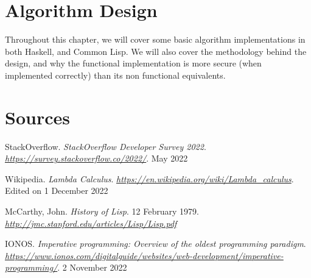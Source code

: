 \documentclass{report}
\newcommand{\csite}[5]{
  #2, #1. \textit{#3}. #4. \textit{\url{#5}} \newline
}
\newcommand{\link}[4]{
  #1. \textit{#2}. \textit{\url{#4}}. #3 \newline
}
\begin{document}
\chapter{Algorithm Design}
Throughout this chapter, we will cover some basic algorithm implementations in both Haskell, and Common Lisp. We will also cover the methodology behind the design, and why the functional implementation is more secure (when implemented correctly) than its non functional equivalents.


\newpage
\chapter{Sources}
\link{StackOverflow}{StackOverflow Developer Survey 2022}{May 2022}{https://survey.stackoverflow.co/2022/}
\link{Wikipedia}{Lambda Calculus}{Edited on 1 December 2022}{https://en.wikipedia.org/wiki/Lambda_calculus}
\csite{John}{McCarthy}{History of Lisp}{12 February 1979}{http://jmc.stanford.edu/articles/Lisp/Lisp.pdf}
\link{IONOS}{Imperative programming: Overview of the oldest programming paradigm}{2 November 2022}{https://www.ionos.com/digitalguide/websites/web-development/imperative-programming/}
\end{document}
